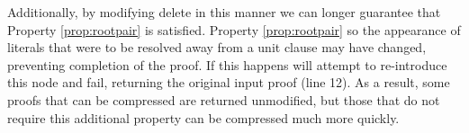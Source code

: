 Additionally, by modifying delete in this manner we can longer guarantee that Property \ref{prop:rootpair} is satisfied. Property \ref{prop:rootpair} so the appearance of literals that were to be resolved away from a unit clause may have changed, preventing completion of the proof. If this happens {\SFOLowerUnits} will attempt to re-introduce this node and fail, returning the original input proof (line 12). As a result, some proofs that can be compressed are returned unmodified, but those that do not require this additional property can be compressed much more quickly.



%


